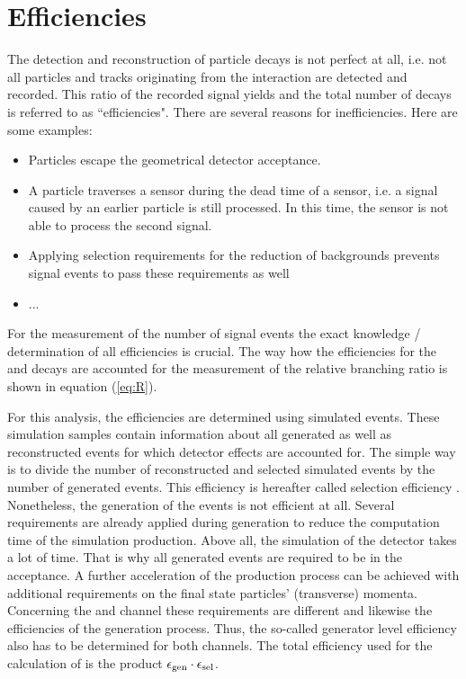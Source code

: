 \chapter{Efficiencies}
\label{sec:Efficiencies}

The detection and reconstruction of particle decays is not perfect at all, i.e. not all particles and tracks originating from the \proton\proton interaction are detected and recorded.
This ratio of the recorded signal yields and the total number of decays is referred to as ``efficiencies".
There are several reasons for inefficiencies.
Here are some examples:
\begin{itemize}
    \item Particles escape the geometrical detector acceptance.
    \item A particle traverses a sensor during the dead time of a sensor, i.e. a signal caused by an earlier particle is still processed. 
          In this time, the sensor is not able to process the second signal.
    \item Applying selection requirements for the reduction of backgrounds prevents signal events to pass these requirements as well
    \item ...
\end{itemize}
For the measurement of the number of signal events the exact knowledge / determination of all efficiencies is crucial.
The way how the efficiencies for the \LbToDpmunuX and \LbToLcmunu decays are accounted for the measurement of the relative branching ratio \R is shown in equation (\ref{eq:R}).

For this analysis, the efficiencies are determined using simulated events.
These simulation samples contain information about all generated as well as reconstructed events for which detector effects are accounted for.
The simple way is to divide the number of reconstructed and selected simulated events by the number of generated events. 
This efficiency is hereafter called selection efficiency \effSel.
Nonetheless, the generation of the events is not efficient at all. 
Several requirements are already applied during generation to reduce the computation time of the simulation production.
Above all, the simulation of the detector takes a lot of time.
That is why all generated events are required to be in the \lhcb acceptance.
A further acceleration of the production process can be achieved with additional requirements on the final state particles' (transverse) momenta.
Concerning the \LbToDpmunuX and \LbToLcmunu channel these requirements are different and likewise the efficiencies of the generation process.
Thus, the so-called generator level efficiency \effGen also has to be determined for both channels. 
The total efficiency used for the calculation of \R is the product $\epsilon_{\text{gen}} \cdot \epsilon_{\text{sel}}$.

